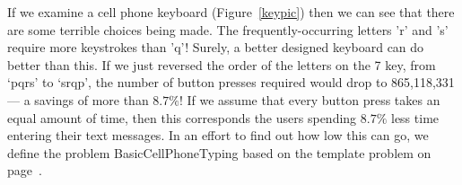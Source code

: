 \documentclass{article}
\begin{document}
If we examine a cell phone keyboard (Figure~\ref{keypic}) then we can see that
there are some terrible choices being made.  The frequently-occurring letters
'r' and 's' require more keystrokes than 'q'!  Surely, a better designed
keyboard can do better than this.  If we just reversed the order of the letters
on the 7 key, from `pqrs' to `srqp', the number of button presses required
would drop to 865,118,331 --- a savings of more than $8.7\%$!  If we assume
that every button press takes an equal amount of time, then this corresponds
the users spending $8.7\%$ less time entering their text messages.  In an
effort to find out how low this can go, we define the problem {\sc
BasicCellPhoneTyping} based on the template problem on
page~\pageref{probtemplate}.



\end{document}

